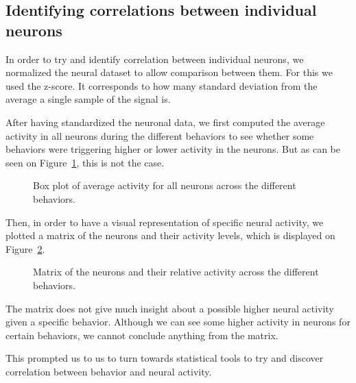 \subsection{Identifying correlations between individual neurons}

In order to try and identify correlation between individual neurons, we normalized the neural dataset to allow comparison between them.
For this we used the z-score.
It corresponds to how many standard deviation from the average a single sample of the signal is.

\vspace{\baselineskip}

After having standardized the neuronal data, we first computed the average activity in all neurons during the different behaviors to see whether some behaviors were triggering higher or lower activity in the neurons. But as can be seen on Figure~\ref{fig::mean_neuron_behav_matrix}, this is not the case. 

\begin{figure}[htbp]
	\begin{center}
		
	\end{center}
	\caption{Box plot of average activity for all neurons across the different behaviors.}
	\label{fig::mean_neuron_behav_matrix}
\end{figure}

Then, in order to have a visual representation of specific neural activity, we plotted a matrix of the neurons and their activity levels, which is displayed on Figure~\ref{fig::neuron_behav_matrix}.

\begin{figure}[htbp]
	\begin{center}
		
	\end{center}
	\caption{Matrix of the neurons and their relative activity across the different behaviors.}
	\label{fig::neuron_behav_matrix}
\end{figure}

The matrix does not give much insight about a possible higher neural activity given a specific behavior.
Although we can see some higher activity in neurons for certain behaviors, we cannot conclude anything from the matrix.

This prompted us to us to turn towards statistical tools to try and discover correlation between behavior and neural activity.

\vspace{\baselineskip}

